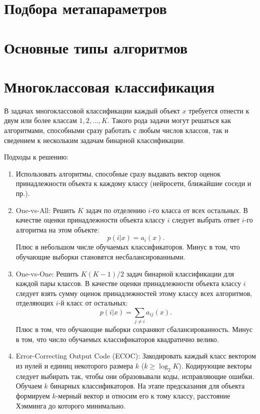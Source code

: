 \section{Подбора метапараметров}


\section{Основные типы алгоритмов}


\section{Многоклассовая классификация}

В задачах многоклассовой классификации каждый объект $x$ требуется отнести к двум или более классам $1, 2, ..., K$.
Такого рода задачи могут решаться как алгоритмами, способными сразу работать с любым числов классов, так и сведением к нескольким задачам бинарной классификации.

Подходы к решению:

\begin{enumerate}
    \item Использовать алгоритмы, способные сразу выдавать вектор оценок принадлежности объекта к каждому классу (нейросети, ближайшие соседи и пр.).
    \item One-vs-All: Решить $K$ задач по отделению $i$-го класса от всех остальных. В качестве оценки принадлежности объекта классу $i$ следует выбрать ответ $i$-го алгоритма на этом объекте:
$$
p(i|x) = a_i(x).
$$
Плюс в небольшом числе обучаемых классификаторов. Минус в том, что обучающие выборки становятся несбалансированными.
    \item One-vs-One: Решить $K(K-1)/2$ задач бинарной классификации для каждой пары классов. В качестве оценки принадлежности объекта классу $i$ следует взять сумму оценок принадлежностей этому классу всех алгоритмов, отделяющих $i$-й класс от остальных:
$$
p(i|x) = \sum_{j \neq i}a_{ij}(x).
$$
Плюс в том, что обучающие выборки сохраняют сбалансированность. Минус в том, что число обучаемых классификаторов квадратично велико.
    \item Error-Correcting Output Code (ECOC): Закодировать каждый класс вектором из нулей и единиц некоторого размера $k$ ($k\geqslant\log_2K$). Кодирующие векторы следует выбирать так, чтобы они образовывали коды, исправляющие ошибки. Обучаем $k$ бинарных классификаторов. На этапе предсказания для объекта формируем $k$-мерный вектор и относим его к тому классу, расстояние Хэмминга до которого минимально. 
\end{enumerate}



